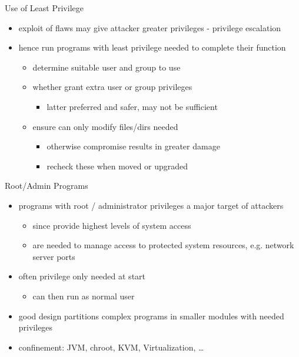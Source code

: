 \documentclass{beamer}
\begin{document}
\begin{frame}{Use of Least Privilege}
  \begin{itemize}
  \item exploit of flaws may give attacker greater
privileges - privilege escalation
\item  hence run programs with least privilege needed
to complete their function
  \begin{itemize}
  \item determine suitable user and group to use
  \item whether grant extra user or group privileges
  \begin{itemize}
  \item  latter preferred and safer, may not be sufficient
  \end{itemize}
\item ensure can only modify files/dirs needed
  \begin{itemize}
  \item  otherwise compromise results in greater damage
  \item  recheck these when moved or upgraded
  \end{itemize}
  \end{itemize}
  \end{itemize}
\end{frame}

\begin{frame}{Root/Admin Programs}
  \begin{itemize}
  \item programs with root / administrator privileges a
major target of attackers
  \begin{itemize}
  \item since provide highest levels of system access
  \item are needed to manage access to protected system
resources, e.g. network server ports
  \end{itemize}
\item  often privilege only needed at start
  \begin{itemize}
  \item can then run as normal user
  \end{itemize}
\item good design partitions complex programs in
smaller modules with needed privileges 
\item confinement: JVM, chroot, KVM, Virtualization, \dots
  \end{itemize}
\end{frame}
\end{document}
